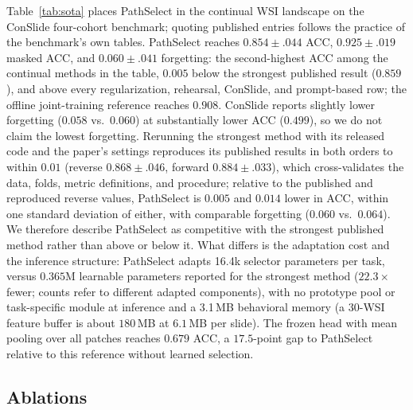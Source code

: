 \documentclass{article}
\begin{document}
Table~\ref{tab:sota} places PathSelect in the continual WSI landscape on the ConSlide four-cohort benchmark; quoting published entries follows the practice of the benchmark's own tables. PathSelect reaches $0.854{\pm}.044$ ACC, $0.925{\pm}.019$ masked ACC, and $0.060{\pm}.041$ forgetting: the second-highest ACC among the continual methods in the table, $0.005$ below the strongest published result ($0.859$), and above every regularization, rehearsal, ConSlide, and prompt-based row; the offline joint-training reference reaches $0.908$. ConSlide reports slightly lower forgetting ($0.058$ vs.\ $0.060$) at substantially lower ACC ($0.499$), so we do not claim the lowest forgetting. Rerunning the strongest method with its released code and the paper's settings reproduces its published results in both orders to within $0.01$ (reverse $0.868{\pm}.046$, forward $0.884{\pm}.033$), which cross-validates the data, folds, metric definitions, and procedure; relative to the published and reproduced reverse values, PathSelect is $0.005$ and $0.014$ lower in ACC, within one standard deviation of either, with comparable forgetting ($0.060$ vs.\ $0.064$). We therefore describe PathSelect as competitive with the strongest published method rather than above or below it. What differs is the adaptation cost and the inference structure: PathSelect adapts 16.4k selector parameters per task, versus $0.365$M learnable parameters reported for the strongest method ($22.3\times$ fewer; counts refer to different adapted components), with no prototype pool or task-specific module at inference and a 3.1\,MB behavioral memory (a 30-WSI feature buffer is about $180$\,MB at $6.1$\,MB per slide). The frozen head with mean pooling over all patches reaches $0.679$ ACC, a $17.5$-point gap to PathSelect relative to this reference without learned selection.

\subsection{Ablations}
\label{ssec:ablation}
\end{document}
